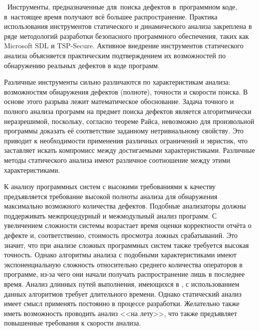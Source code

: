 \actuality\
Инструменты, предназначенные для~поиска дефектов в~программном коде, в~настоящее время получают всё большее распространение. Практика использования инструментов статического и динамического анализа закреплена в ряде методологий разработки безопасного программного обеспечения, таких как Microsoft SDL и TSP-Secure. Активное внедрение инструментов статического анализа объясняется практическим подтверждением их возможностей по обнаружению реальных дефектов в коде программ. 

Различные инструменты сильно различаются по характеристикам анализа: возможностям обнаружения дефектов (полноте), точности и скорости поиска. В основе этого разрыва лежит математическое обоснование. Задача точного и полного анализа программ на предмет поиска дефектов является алгоритмически неразрешимой, поскольку, согласно теореме Райса, невозможно для произвольной программы доказать её соответствие заданному нетривиальному свойству. Это приводит к необходимости применения различных ограничений и эвристик, что заставляет искать компромисс между достигаемыми характеристиками. Различные методы статического анализа имеют различное соотношение между этими характеристиками. %

К анализу программных систем с высокими требованиями к качеству предъявляется требование высокой полноты анализа для обнаружения максимально возможного количества дефектов. Подобные анализаторы должны поддерживать межпроцедурный и межмодульный анализ программ. С увеличением сложности системы возрастает время оценки корректности отчёта о дефекте и, соответственно, стоимость просмотра ложных срабатываний. Это значит, что при анализе сложных программных систем также требуется высокая точность. Однако алгоритмы анализа с подобными характеристиками имеют экспоненциальную сложность относительно среднего количества операторов в программе, из-за чего они начали получать распространение лишь в последнее время. Анализ длинных путей выполнения, имеющихся в , с использованием данных алгоритмов требует длительного времени. Однако статический анализ имеет смысл применять постоянно в процессе разработки. Желательно также иметь возможность проводить анализ <<на лету>>, что также предъявляет повышенные требования к скорости анализа.

